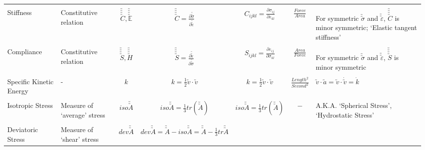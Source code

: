 \documentclass[10pt]{article}
\newcommand{\tuu}[1]{\utilde{\utilde{#1}}}
\newcommand{\tuuuu}[1]{\utilde{\utilde{\utilde{\utilde{#1}}}}}
\begin{document}
\begin{center}
\begin{tabular}{l m{3in} c c c c m{5in}}
\hline
\\[-1ex]
Stiffness
&%
Constitutive relation
&%
$ \tuuuu{C}, \tuuuu{\mathbb{E}} $
&%
$ \tuuuu{C} = \frac{\partial \tuu{\sigma}}{\partial \tuu{\varepsilon}} $
&%
$ C_{ijkl} = \frac{\partial \sigma_{ij}}{\partial \varepsilon_{kl}} $
&%
$ \frac{Force}{Area} $
&%
For symmetric $\tuu{\sigma}$ and $\tuu{\varepsilon}$, $\tuuuu{C}$ is minor symmetric; `Elastic tangent stiffness'
\\[1ex]
\hline
\\[-1ex]
Compliance
&%
Constitutive relation
&%
$ \tuuuu{S}, \tuuuu{H}$
&%
$ \tuuuu{S} = \frac{\partial \tuu{\varepsilon}}{\partial \tuu{\sigma}} $
&%
$ S_{ijkl} = \frac{\partial \varepsilon_{ij}}{\partial \sigma_{kl}} $
&%
$ \frac{Area}{Force} $
&%
For symmetric $\tuu{\sigma}$ and $\tuu{\varepsilon}$, $\tuuuu{S}$ is minor symmetric
\\[1ex]
\hline
\\[-1ex]
Specific Kinetic Energy
&%
-
&%
$ k $
&%
$ k =\frac{1}{2}\utilde{v}\cdot\utilde{v}$
&%
$ k =\frac{1}{2}\utilde{v}\cdot\utilde{v}$
&%
$ \frac{Length^{2}}{Second^{2}} $
&%
$ \utilde{v}\cdot\utilde{a}=\utilde{v}\cdot\dot{\utilde{v}}=\dot{k} $
\\[1ex]
\hline
\\[-1ex]
Isotropic Stress
&%
Measure of `average' stress
&%
$ iso\utilde{\utilde{A}} $
&%
$ iso\utilde{\utilde{A}} = \frac{1}{3}tr(\utilde{\utilde{A}}) $
&%
$ iso\utilde{\utilde{A}} = \frac{1}{3}tr(\utilde{\utilde{A}}) $
&%
$ - $
&%
A.K.A. `Spherical Stress', `Hydrostatic Stress'
\\[1ex]
\hline
\\[-1ex]
Deviatoric Stress
&%
Measure of `shear' stress
&%
$ dev\utilde{\utilde{A}} $
&%
$ dev\utilde{\utilde{A}} =  \utilde{\utilde{A}}-iso\utilde{\utilde{A}} = \utilde{\utilde{A}}-\frac{1}{3}tr\utilde{\utilde{A}} $

\end{tabular}
\end{center}
\end{document}
